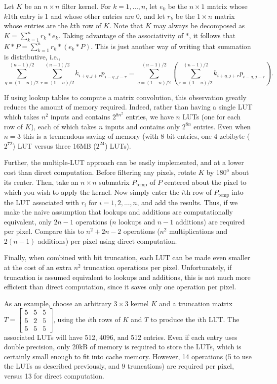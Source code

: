 \documentclass[12pt]{amsart}
\theoremstyle{definition}
\theoremstyle{remark}
\numberwithin{thm}{section}
\begin{document}
Let $K$ be an $n\times n$ filter kernel. For $k=1,\ldots,n$, let $e_k$ be the $n\times 1$ matrix whose $k1$th entry is 1 and whose other entries are 0, and let $r_k$ be the $1\times n$ matrix whose entries are the $k$th row of $K$. Note that $K$ may always be decomposed as $K = \sum_{k=1}^nr_k * e_k$. Taking advantage of the associativity of $*$, it follows that $K * P = \sum_{k=1}^nr_k * \left(e_k * P\right)$. This is just another way of writing that summation is distributive, i.e.,
\[\sum_{q = (1-n)/2}^{(n-1)/2}\sum_{r = (1-n)/2}^{(n-1)/2}k_{i+q,j+r}p_{i-q,j-r} = \sum_{q = (1-n)/2}^{(n-1)/2}\left(\sum_{r = (1-n)/2}^{(n-1)/2}k_{i+q,j+r}p_{i-q,j-r}\right).\]

If using lookup tables to compute a matrix convolution, this observation greatly reduces the amount of memory required. Indeed, rather than having a single LUT which takes $n^2$ inputs and contains $2^{8n^2}$ entries, we have $n$ LUTs (one for each row of $K$), each of which takes $n$ inputs and contains only $2^{8n}$ entries. Even when $n=3$ this is a tremendous saving of memory (with 8-bit entries, one 4-zebibyte ($2^{72}$) LUT versus three 16MB ($2^{24}$) LUTs).

Further, the multiple-LUT approach can be easily implemented, and at a lower cost than direct computation. Before filtering any pixels, rotate $K$ by $180^o$ about its center. Then, take an $n\times n$ submatrix $P_{\mathrm{temp}}$ of $P$ centered about the pixel to which you wish to apply the kernel. Now simply enter the $i$th row of $P_{\mathrm{temp}}$ into the LUT associated with $r_i$ for $i = 1,2,\ldots,n$, and add the results. Thus, if we make the naive assumption that lookups and additions are computationally equivalent, only $2n-1$ operations ($n$ lookups and $n-1$ additions) are required per pixel. Compare this to $n^2+2n-2$ operations ($n^2$ multiplications and $2(n-1)$ additions) per pixel using direct computation.

Finally, when combined with bit truncation, each LUT can be made even smaller at the cost of an extra $n^2$ truncation operations per pixel. Unfortunately, if truncation is assumed equivalent to lookups and additions, this is not much more efficient than direct computation, since it saves only one operation per pixel. 

As an example, choose an arbitrary $3\times 3$ kernel $K$ and a truncation matrix $T = \left[\begin{smallmatrix}5 & 5 & 5\\5 & 2 & 5\\ 5 & 5 & 5\end{smallmatrix}\right]$, using the $i$th rows of $K$ and $T$ to produce the $i$th LUT. The associated LUTs will have 512, 4096, and 512 entries. Even if each entry uses double precision, only 20kB of memory is required to store the LUTs, which is certainly small enough to fit into cache memory. However, 14 operations (5 to use the LUTs as described previously, and 9 truncations) are required per pixel, versus 13 for direct computation. 
\end{document}
